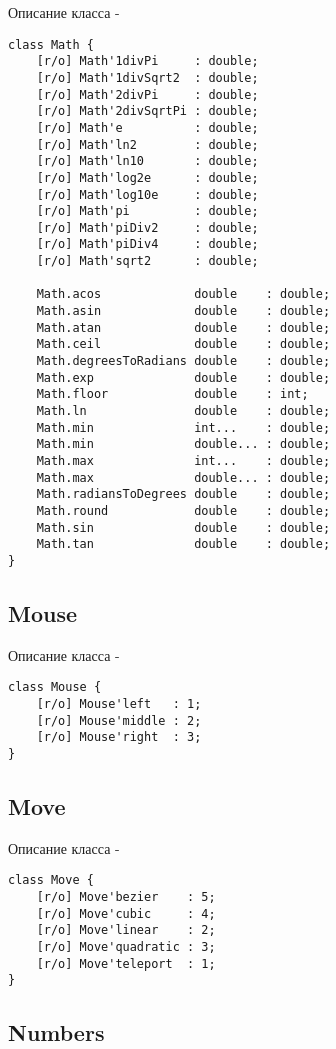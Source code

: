 \noindent Описание класса  -
\begin{lstlisting}[numbers=none]
class Math {
    [r/o] Math'1divPi     : double;
	[r/o] Math'1divSqrt2  : double;
	[r/o] Math'2divPi     : double;
	[r/o] Math'2divSqrtPi : double;
	[r/o] Math'e          : double;
	[r/o] Math'ln2        : double;
	[r/o] Math'ln10       : double;
	[r/o] Math'log2e      : double;
	[r/o] Math'log10e     : double;
	[r/o] Math'pi         : double;
	[r/o] Math'piDiv2     : double;
	[r/o] Math'piDiv4     : double;
	[r/o] Math'sqrt2      : double;
	
    Math.acos             double    : double;
	Math.asin             double    : double;
	Math.atan             double    : double;
	Math.ceil             double    : double;
	Math.degreesToRadians double    : double;
	Math.exp              double    : double;
	Math.floor            double    : int;
	Math.ln               double    : double;
	Math.min              int...    : double;
	Math.min              double... : double;
	Math.max              int...    : double;
	Math.max              double... : double;
	Math.radiansToDegrees double    : double;
	Math.round            double    : double;
	Math.sin              double    : double;
	Math.tan              double    : double;
}
\end{lstlisting}

\subsection{{\color{orange} Mouse}}

\noindent Описание класса  -
\begin{lstlisting}[numbers=none]
class Mouse {
    [r/o] Mouse'left   : 1;
	[r/o] Mouse'middle : 2;
	[r/o] Mouse'right  : 3;
}
\end{lstlisting}

\subsection{{\color{orange} Move}}

\noindent Описание класса  -
\begin{lstlisting}[numbers=none]
class Move {
    [r/o] Move'bezier    : 5;
	[r/o] Move'cubic     : 4;
	[r/o] Move'linear    : 2;
	[r/o] Move'quadratic : 3;
	[r/o] Move'teleport  : 1;
}
\end{lstlisting}

\subsection{{\color{orange} Numbers}}

